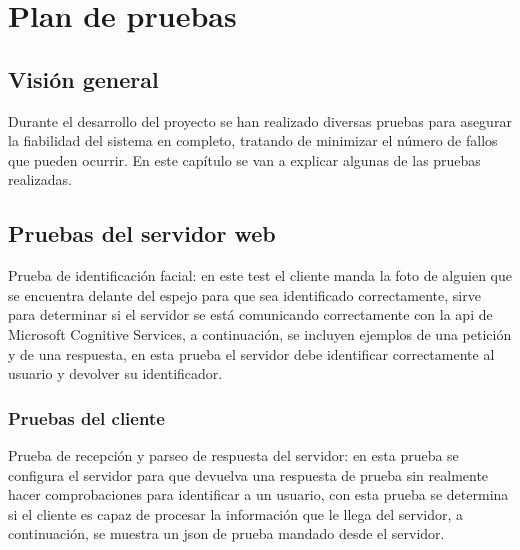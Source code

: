 \chapter{Plan de pruebas}

\section{Visión general}

Durante el desarrollo del proyecto se han realizado diversas pruebas para asegurar la fiabilidad del sistema en completo, tratando de minimizar el número de fallos que pueden ocurrir. En este capítulo se van a explicar algunas de las pruebas realizadas.

\section{Pruebas del servidor web}

Prueba de identificación facial: en este test el cliente manda la foto de alguien que se encuentra delante del espejo para que sea identificado correctamente, sirve para determinar si el servidor se está comunicando correctamente con la \acrshort{api} de Microsoft Cognitive Services, a continuación, se incluyen ejemplos de una petición y de una respuesta, en esta prueba el servidor debe identificar correctamente al usuario y devolver su identificador.









\subsection{Pruebas del cliente}

Prueba de recepción y parseo de respuesta del servidor: en esta prueba se configura el servidor para que devuelva una respuesta de prueba sin realmente hacer comprobaciones para identificar a un usuario, con esta prueba se determina si el cliente es capaz de procesar la información que le llega del servidor, a continuación, se muestra un \acrshort{json} de prueba mandado desde el servidor.



